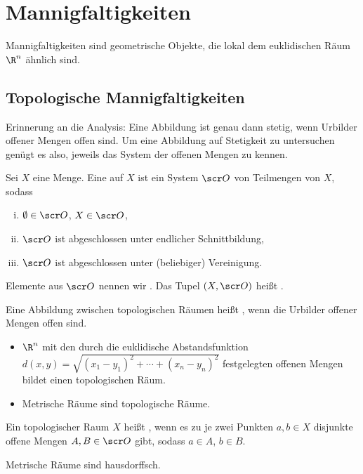 \chapter{Mannigfaltigkeiten}

Mannigfaltigkeiten sind geometrische Objekte, die lokal dem euklidischen Räum $\R^n$ ähnlich sind.

\section{Topologische Mannigfaltigkeiten}

Erinnerung an die Analysis:
Eine Abbildung ist genau dann stetig, wenn Urbilder offener Mengen offen sind.
Um eine Abbildung auf Stetigkeit zu untersuchen genügt es also, jeweils das System der offenen Mengen zu kennen.

\begin{df} \label{1.1} %
    Sei $X$ eine Menge.
    Eine  auf $X$ ist ein System $\scr O$ von Teilmengen von $X$, sodass
    \begin{enumerate}[(i)]
        \item
            $\emptyset \in \scr O$, $X \in \scr O$,
        \item
            $\scr O$ ist abgeschlossen unter endlicher Schnittbildung,
        \item
            $\scr O$ ist abgeschlossen unter (beliebiger) Vereinigung.
    \end{enumerate}
    Elemente aus $\scr O$ nennen wir .
    Das Tupel $(X, \scr O)$ heißt .

    Eine Abbildung zwischen topologischen Räumen heißt , wenn die Urbilder offener Mengen offen sind.
\end{df}

\begin{ex*}
    \begin{itemize}
        \item
            $\R^n$ mit den durch die euklidische Abstandsfunktion $d(x,y) = \sqrt{(x_1 - y_1)^2 + \dotsb + (x_n - y_n)^2}$ festgelegten offenen Mengen bildet einen topologischen Räum.
        \item
            Metrische Räume sind topologische Räume.
    \end{itemize}
\end{ex*}

\begin{df} \label{1.2} %
    Ein topologischer Raum $X$ heißt , wenn es zu je zwei Punkten $a, b \in X$ disjunkte offene Mengen $A, B \in \scr O$ gibt, sodass $a \in A$, $b \in B$.
    \begin{note}
        Metrische Räume sind hausdorffsch.
    \end{note}
\end{df}

